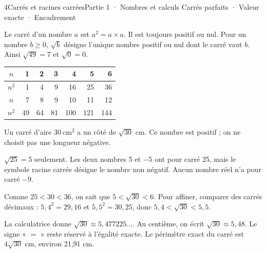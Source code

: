 \begin{ouverture}[calcul]{4}{Carrés et racines carrées}{Partie 1 · Nombres et calculs}
{Carrés parfaits · Valeur exacte · Encadrement}
\end{ouverture}
\pagestyle{otMain}\essentiel\fontsize{11}{15}\selectfont
{}\label{cours-4-1}
\begin{definition}Le carré d’un nombre $a$ est $a^2=a\times a$. Il est toujours positif ou nul. Pour un nombre $b\ge0$, $\sqrt b$ désigne l’unique nombre positif ou nul dont le carré vaut $b$. Ainsi $\sqrt{49}=7$ et $\sqrt0=0$.\end{definition}
\begin{center}\begin{tabular}{c|rrrrrr}\toprule
$n$ & 1 & 2 & 3 & 4 & 5 & 6\\\midrule
$n^2$ & 1 & 4 & 9 & 16 & 25 & 36\\\midrule
$n$ & 7 & 8 & 9 & 10 & 11 & 12\\\midrule
$n^2$ & 49 & 64 & 81 & 100 & 121 & 144\\\bottomrule
\end{tabular}\end{center}
\begin{exemple}Un carré d’aire $30\ \mathrm{cm}^2$ a un côté de $\sqrt{30}$ cm. Ce nombre est positif ; on ne choisit pas une longueur négative.\end{exemple}
\begin{attention}$\sqrt{25}=5$ seulement. Les deux nombres 5 et $-5$ ont pour carré 25, mais le symbole racine carrée désigne le nombre non négatif. Aucun nombre réel n’a pour carré $-9$.\end{attention}
\clearpage
{}\label{cours-4-2}
\begin{savoirfaire}Comme $25<30<36$, on sait que $5<\sqrt{30}<6$. Pour affiner, comparer des carrés décimaux : $5{,}4^2=29{,}16$ et $5{,}5^2=30{,}25$, donc $5{,}4<\sqrt{30}<5{,}5$.\end{savoirfaire}
\begin{exemple}La calculatrice donne $\sqrt{30}\approx5{,}477225\ldots$. Au centième, on écrit $\sqrt{30}\approx5{,}48$. Le signe « $=$ » reste réservé à l’égalité exacte. Le périmètre exact du carré est $4\sqrt{30}$ cm, environ 21,91 cm.\end{exemple}
